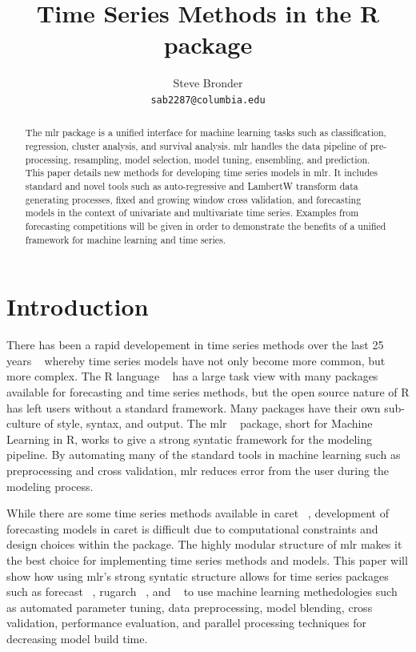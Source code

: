 \documentclass{article}\usepackage[]{graphicx}\usepackage[]{color}
\title{Time Series Methods in the R package \pkg{mlr}}
\author{
  Steve Bronder \\
  \texttt{sab2287@columbia.edu} \\
}
\theoremstyle{definition}
\let\proglang=\textsf
\newcommand{\pkg}[1]{{\fontseries{b}\selectfont #1}}
\begin{document}

\maketitle

\begin{abstract}
The \pkg{mlr} package is a unified interface for machine learning tasks such as classification, regression, cluster analysis, and survival analysis. \pkg{mlr} handles the data pipeline of pre-processing, resampling, model selection, model tuning, ensembling, and prediction. This paper details new methods for developing time series  models in \pkg{mlr}. It includes standard and novel tools such as auto-regressive and LambertW transform data generating processes, fixed and growing window cross validation, and forecasting models in the context of univariate and multivariate time series. Examples from forecasting competitions will be given in order to demonstrate the benefits of a unified framework for machine learning and time series.
  \end{abstract}

\section{Introduction}
There has been a rapid developement in time series methods over the last 25 years ~\cite{Hyndman25} whereby time series models have not only become more common, but more complex. The \proglang{R} language ~\cite{Rbase} has a large task view with many packages available for forecasting and time series methods, but the open source nature of R has left users without a standard framework. Many packages have their own sub-culture of style, syntax, and output. The \pkg{mlr} ~\cite{mlr} package, short for Machine Learning in R, works to give a strong syntatic framework for the modeling pipeline. By automating many of the standard tools in machine learning such as preprocessing and cross validation, \pkg{mlr} reduces error from the user during the modeling process. 

While there are some time series methods available in \pkg{caret} ~\cite{caret}, development of forecasting models in \pkg{caret} is difficult due to computational constraints and design choices within the package. The highly modular structure of \pkg{mlr} makes it the best choice for implementing time series methods and models. This paper will show how using \pkg{mlr}'s strong syntatic structure allows for time series packages such as \pkg{forecast} ~\cite{HyndForecast}, \pkg{rugarch} ~\cite{rugarch}, and ~\cite{BigVAR} to use machine learning methedologies such as automated parameter tuning, data preprocessing, model blending, cross validation, performance evaluation, and parallel processing techniques for decreasing model build time.
\end{document}

